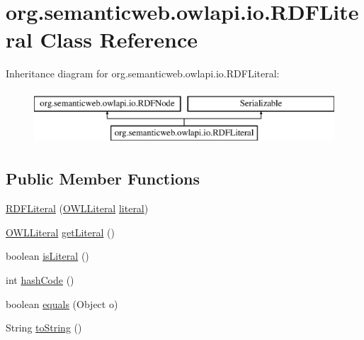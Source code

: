 \hypertarget{classorg_1_1semanticweb_1_1owlapi_1_1io_1_1_r_d_f_literal}{\section{org.\-semanticweb.\-owlapi.\-io.\-R\-D\-F\-Literal Class Reference}
\label{classorg_1_1semanticweb_1_1owlapi_1_1io_1_1_r_d_f_literal}
}
Inheritance diagram for org.\-semanticweb.\-owlapi.\-io.\-R\-D\-F\-Literal\-:\begin{figure}[H]
\begin{center}
\leavevmode
\includegraphics[height=2.000000cm]{classorg_1_1semanticweb_1_1owlapi_1_1io_1_1_r_d_f_literal}
\end{center}
\end{figure}
\subsection*{Public Member Functions}
\begin{DoxyCompactItemize}
\item 
\hyperlink{classorg_1_1semanticweb_1_1owlapi_1_1io_1_1_r_d_f_literal_a9495a43390b223a4070a51f83878968f}{R\-D\-F\-Literal} (\hyperlink{interfaceorg_1_1semanticweb_1_1owlapi_1_1model_1_1_o_w_l_literal}{O\-W\-L\-Literal} \hyperlink{classorg_1_1semanticweb_1_1owlapi_1_1io_1_1_r_d_f_literal_ad3d2bd5f19ddbc20617217dd4f2a24d8}{literal})
\item 
\hyperlink{interfaceorg_1_1semanticweb_1_1owlapi_1_1model_1_1_o_w_l_literal}{O\-W\-L\-Literal} \hyperlink{classorg_1_1semanticweb_1_1owlapi_1_1io_1_1_r_d_f_literal_ac6559e87a7b2e6722c9510f41106cb72}{get\-Literal} ()
\item 
boolean \hyperlink{classorg_1_1semanticweb_1_1owlapi_1_1io_1_1_r_d_f_literal_a82b4759b9c92fd4ff5b6b0a9283c3b56}{is\-Literal} ()
\item 
int \hyperlink{classorg_1_1semanticweb_1_1owlapi_1_1io_1_1_r_d_f_literal_ac679db932e8960c3297b63350f4cb5bc}{hash\-Code} ()
\item 
boolean \hyperlink{classorg_1_1semanticweb_1_1owlapi_1_1io_1_1_r_d_f_literal_ae282d384fb66eaf6c687123e0fb3220b}{equals} (Object o)
\item 
String \hyperlink{classorg_1_1semanticweb_1_1owlapi_1_1io_1_1_r_d_f_literal_aa5f06aeb266b30c45d2b6b9cbe84e131}{to\-String} ()
\end{DoxyCompactItemize}
